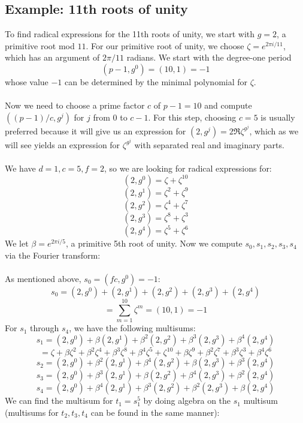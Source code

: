 \documentclass{article}
\begin{document}
    \subsection{Example: 11th roots of unity}
        To find radical expressions for the 11th roots of unity, we start with $ g = 2 $, a primitive root mod $ 11 $. For our primitive root of unity, we choose $ \zeta = e^{2 \pi i/11} $, which has an argument of $ 2\pi/11 $ radians. We start with the degree-one period
        $$ (p - 1, g^0) = (10, 1) = -1 $$
        whose value $ -1 $ can be determined by the minimal polynomial for $ \zeta $.\\
        \\
        Now we need to choose a prime factor $ c $ of $ p - 1 = 10 $ and compute $ ((p - 1)/c, g^j) $ for $ j $ from $ 0 $ to $ c - 1 $. For this step, choosing $ c = 5 $ is usually preferred because it will give us an expression for $ (2, g^j) = 2 \Re \zeta^{g^j} $, which as we will see yields an expression for $ \zeta^{g^j} $ with separated real and imaginary parts.\\
        \\
        We have $ d = 1, c = 5, f = 2 $, so we are looking for radical expressions for:
        $$ (2, g^0) = \zeta + \zeta^{10} $$
        $$ (2, g^1) = \zeta^2 + \zeta^9 $$
        $$ (2, g^2) = \zeta^4 + \zeta^7 $$
        $$ (2, g^3) = \zeta^8 + \zeta^3 $$
        $$ (2, g^4) = \zeta^5 + \zeta^6 $$
        We let $ \beta = e^{2\pi i/5} $, a primitive 5th root of unity. Now we compute $ s_0, s_1, s_2, s_3, s_4 $ via the Fourier transform:\\
        \\
        As mentioned above, $ s_0 = (fc, g^0) = -1 $:
        $$ s_0 = (2, g^0) + (2, g^1) + (2, g^2) + (2, g^3) + (2, g^4) $$
        $$ = \sum_{m = 1}^{10} \zeta^m = (10, 1) = -1 $$
        For $ s_1 $ through $ s_4 $, we have the following multisums:
        $$ s_1 = (2, g^0) + \beta (2, g^1) + \beta^2 (2, g^2) + \beta^3 (2, g^3) + \beta^4 (2, g^4) $$
        $$ = \zeta + \beta \zeta^2 + \beta^2 \zeta^4 + \beta^3 \zeta^8 + \beta^4 \zeta^5 + \zeta^{10} + \beta \zeta^9 + \beta^2 \zeta^7 + \beta^3 \zeta^3 + \beta^4 \zeta^6 $$
        $$ s_2 = (2, g^0) + \beta^2 (2, g^1) + \beta^4 (2, g^2) + \beta (2, g^3) + \beta^3 (2, g^4) $$
        $$ s_3 = (2, g^0) + \beta^3 (2, g^1) + \beta (2, g^2) + \beta^4 (2, g^3) + \beta^2 (2, g^4) $$
        $$ s_4 = (2, g^0) + \beta^4 (2, g^1) + \beta^3 (2, g^2) + \beta^2 (2, g^3) + \beta (2, g^4) $$
        We can find the multisum for $ t_1 = s_1^5 $ by doing algebra on the $ s_1 $ multisum (multisums for $ t_2, t_3, t_4 $ can be found in the same manner):
\end{document}
